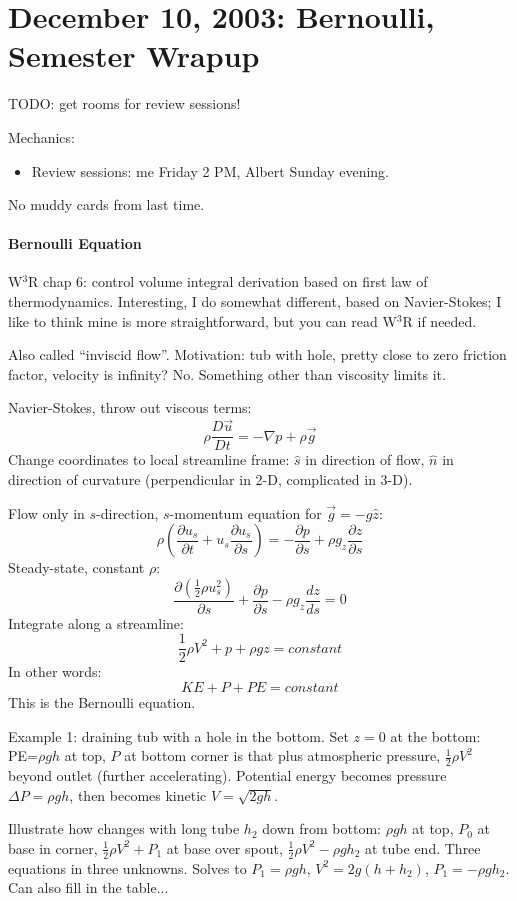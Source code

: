 \documentclass{report}
\begin{document}
\section{December 10, 2003: Bernoulli, Semester Wrapup}

TODO: get rooms for review sessions!

Mechanics:
\begin{itemize}
\item Review sessions: me Friday 2 PM, Albert Sunday evening.
\end{itemize}
No muddy cards from last time.

\paragraph{Bernoulli Equation}

W$^3$R chap 6: control volume integral derivation based on first law of
thermodynamics.  Interesting, I do somewhat different, based on Navier-Stokes;
I like to think mine is more straightforward, but you can read W$^3$R if
needed.

Also called ``inviscid flow''.  Motivation: tub with hole, pretty close to zero
friction factor, velocity is infinity?  No.  Something other than viscosity
limits it.

Navier-Stokes, throw out viscous terms:
$$\rho\frac{D\vec{u}}{Dt} = -\nabla p + \rho\vec{g}$$
Change coordinates to local streamline frame: $\hat{s}$ in direction of flow,
$\hat{n}$ in direction of curvature (perpendicular in 2-D, complicated in 3-D).

Flow only in $s$-direction, $s$-momentum equation for $\vec{g} = -g\hat{z}$:
$$\rho\left(\frac{\partial u_s}{\partial t}
  + u_s\frac{\partial u_s}{\partial s}\right)
= -\frac{\partial p}{\partial s} + \rho g_z\frac{\partial z}{\partial s}$$
Steady-state, constant $\rho$:
$$\frac{\partial \left(\frac{1}{2}\rho u_s^2\right)}{\partial s}
+ \frac{\partial p}{\partial s}- \rho g_z\frac{dz}{ds} = 0$$
Integrate along a streamline:
$$\frac{1}{2}\rho V^2 + p + \rho gz = constant$$
In other words:
$$KE + P + PE = constant$$
This is the Bernoulli equation.

Example 1: draining tub with a hole in the bottom.  Set $z=0$ at the bottom:
PE=$\rho gh$ at top, $P$ at bottom corner is that plus atmospheric pressure,
$\frac{1}{2}\rho V^2$ beyond outlet (further accelerating).  Potential energy
becomes pressure $\Delta P=\rho gh$, then becomes kinetic $V=\sqrt{2 gh}$.

Illustrate how changes with long tube $h_2$ down from bottom: $\rho gh$ at top,
$P_0$ at base in corner, $\frac{1}{2}\rho V^2 + P_1$ at base over spout,
$\frac{1}{2}\rho V^2 -\rho gh_2$ at tube end.  Three equations in three
unknowns.  Solves to $P_1=\rho gh$, $V^2=2g(h+h_2)$, $P_1 = -\rho gh_2$.  Can
also fill in the table...
\end{document}
